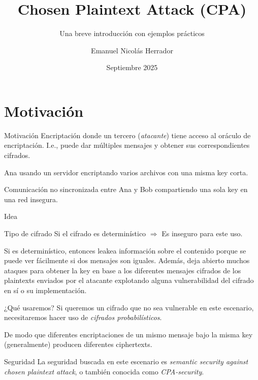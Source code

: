 

\title{Chosen Plaintext Attack (CPA)}
\subtitle{Una breve introducción con ejemplos prácticos}
\author[Emanuel N. Herrador]{Emanuel Nicolás Herrador}
\date{Septiembre 2025}


\frame{\titlepage}


\section{Motivación}
\begin{frame}{Motivación}
  Encriptación donde un tercero (\textit{atacante}) tiene acceso al oráculo de encriptación.
  I.e., puede dar múltiples mensajes y obtener sus correspondientes cifrados.
  \begin{example}
    Ana usando un servidor encriptando varios archivos con una misma key corta.
  \end{example}
  \begin{example}
    Comunicación no sincronizada entre Ana y Bob compartiendo una sola key en una red insegura.
  \end{example}
\end{frame}

\begin{frame}[allowframebreaks]{Idea}
  \begin{alertblock}{Tipo de cifrado}
    Si el cifrado es determinístico $\Rightarrow$ Es inseguro para este uso.
  \end{alertblock}
  Si es determinístico, entonces leakea información sobre el contenido porque se puede ver 
  fácilmente si dos mensajes son iguales.
  Además, deja abierto muchos ataques para obtener la key en base a los diferentes mensajes 
  cifrados de los plaintexts enviados por el atacante explotando alguna vulnerabilidad del 
  cifrado en sí o su implementación.
  \framebreak

  \begin{alertblock}{¿Qué usaremos?}
    Si queremos un cifrado que no sea vulnerable en este escenario, necesitaremos hacer uso 
    de \textit{cifrados probabilísticos}.
  \end{alertblock}
  De modo que diferentes encriptaciones de un mismo mensaje bajo la misma key (generalmente)
  producen diferentes ciphertexts.

  \begin{block}{Seguridad}
    La seguridad buscada en este escenario es \textit{semantic security against chosen
    plaintext attack}, o también conocida como \textit{CPA-security}.
  \end{block}
\end{frame}

